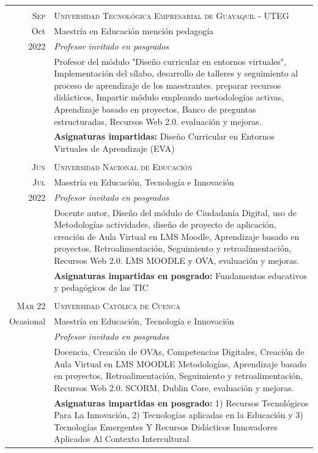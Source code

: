 \documentclass[a4paper]{article}
\begin{document}
\begin{longtable}{r|p{12cm}}
\multicolumn{2}{c}{} \\
\textsc{Sep} & \textsc{Universidad Tecnológica Empresarial de Guayaquil - UTEG} \\
 Oct& Maestría en Educación mención pedagogía\\
 2022&\emph{Profesor invitado en posgrados}\\
 &\footnotesize{Profesor del módulo "Diseño curricular en entornos virtuales", Implementación del sílabo, desarrollo de talleres y seguimiento al proceso de aprendizaje de los maestrantes. preparar recursos didácticos, Impartir módulo empleando metodologías activas, Aprendizaje basado en proyectos, Banco de preguntas estructuradas, Recursos Web 2.0. evaluación y mejoras.}\\ & \footnotesize{\textbf{Asignaturas impartidas:} Diseño Curricular en Entornos Virtuales de Aprendizaje (EVA)}\\
 
\multicolumn{2}{c}{} \\
\textsc{Jun} & \textsc{Universidad Nacional de Educación} \\
\textsc{Jul}& Maestría en Educación, Tecnología e Innovación\\
2022&\emph{Profesor invitado en posgrados}\\
&\footnotesize{Docente autor, Diseño del módulo de Ciudadanía Digital, uso de Metodologías actividades, diseño de proyecto de aplicación, creación de Aula Virtual en LMS Moodle, Aprendizaje basado en proyectos, Retroalimentación, Seguimiento y retroalimentación, Recursos Web 2.0. LMS MOODLE y OVA, evaluación y mejoras. }\\ & \footnotesize{\textbf{Asignaturas impartidas en posgrado:} Fundamentos educativos y pedagógicos de las TIC}\\

\multicolumn{2}{c}{} \\
\textsc{Mar 22} & \textsc{Universidad Católica de Cuenca} \\
Ocasional & Maestría en Educación, Tecnología e Innovación\\
&\emph{Profesor invitado en posgrados}\\&\footnotesize{Docencia, Creación de OVAs, Competencias Digitales, Creación de Aula Virtual en LMS MOODLE Metodologías, Aprendizaje basado en proyectos, Retroalimentación, Seguimiento y retroalimentación, Recursos Web 2.0. SCORM, Dublin Core, evaluación y mejoras. }\\ & \footnotesize{\textbf{Asignaturas impartidas en posgrado:} 1) Recursos Tecnológicos Para La Innovación, 2) Tecnologías aplicadas en la Educación y 3) Tecnologías Emergentes Y Recursos Didácticos Innovadores Aplicados Al Contexto Intercultural} \\


\end{longtable}
\end{document}
